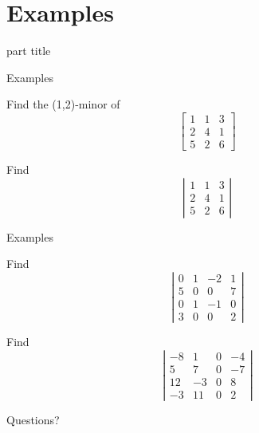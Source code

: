 \documentclass{beamer}
\begin{document}
\section{Examples}

\begin{frame}
  \begin{beamercolorbox}[sep=12pt,center]{part title}
    \insertsection\par
  \end{beamercolorbox}
\end{frame}

\begin{frame}{Examples}
  \begin{example}
    Find the (1,2)-minor of
    \begin{equation*}
      \left[
	\begin{array}{ccc}
          1&1&3\\
          2&4&1\\
          5&2&6
	\end{array}
      \right]
    \end{equation*}
  \end{example}
  \begin{example}
    Find
    \begin{equation*}
      \left|
	\begin{array}{ccc}
          1&1&3\\
          2&4&1\\
          5&2&6
	\end{array}
      \right|
    \end{equation*}
  \end{example}
\end{frame}

\begin{frame}{Examples}
  \begin{example}
    Find
    \begin{equation*}
      \left|
        \begin{array}{cccc}
          0&1&-2&1\\
          5&0&0&7\\
          0&1&-1&0\\
          3&0&0&2
        \end{array}
      \right|
    \end{equation*}
  \end{example}
  \begin{example}
    Find
    \begin{equation*}
      \left|
        \begin{array}{cccc}
          -8&1&0&-4\\
          5&7&0&-7\\
          12&-3&0&8\\
          -3&11&0&2
        \end{array}
      \right|
    \end{equation*}
  \end{example}
\end{frame}

\begin{frame}
  Questions?
\end{frame}
\end{document}
